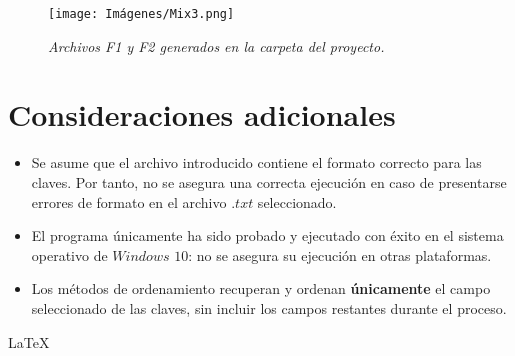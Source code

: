 \documentclass[letterpaper,12pt]{extarticle}
\begin{document}
\begin{figure}[h!]
\centering
\texttt{[image: Imágenes/Mix3.png]}
\caption{\textit{Archivos F1 y F2 generados en la carpeta del proyecto.}}
\label{fig:Mix2}
\end{figure}

\pagebreak

\section{Consideraciones adicionales}

\begin{itemize}
\item Se asume que el archivo introducido contiene el formato correcto para las claves. Por tanto, no se asegura una correcta ejecución en caso de presentarse errores de formato en el archivo $.txt$ seleccionado.

\item El programa únicamente ha sido probado  y ejecutado con éxito en el sistema operativo de $Windows$ $10$: no se asegura su ejecución en otras plataformas.

\item Los métodos de ordenamiento recuperan y ordenan \textbf{únicamente} el campo seleccionado de las claves, sin incluir los campos restantes durante el proceso.


\end{itemize}



\centering\vspace*{\fill} \LaTeX{}
\end{document}
